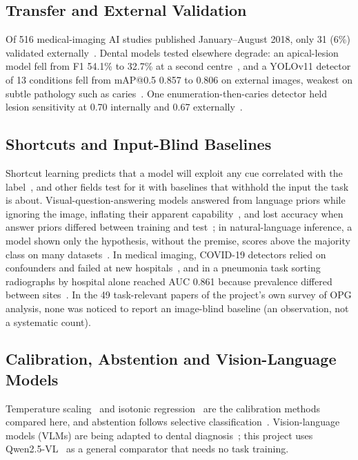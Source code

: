 \subsection{Transfer and External Validation}

Of 516 medical-imaging AI studies published January--August 2018, only 31 (6\%) validated
externally~\cite{kim2019design}. Dental models tested elsewhere degrade: an apical-lesion model fell
from F1 54.1\% to 32.7\% at a second centre~\cite{krois2021generalizability}, and a YOLOv11 detector of
13 conditions fell from mAP@0.5 0.857 to 0.806 on external images, weakest on subtle pathology such as
caries~\cite{mutlu2026comparison}. One enumeration-then-caries detector held lesion sensitivity at
0.70 internally and 0.67 externally~\cite{bizjak2024advancing}. %

\subsection{Shortcuts and Input-Blind Baselines}

Shortcut learning predicts that a model will exploit any cue correlated with the
label~\cite{geirhos2020shortcut}, and other fields test for it with baselines that withhold the input
the task is about. Visual-question-answering models answered from language priors while ignoring the
image, inflating their apparent capability~\cite{goyal2017making}, and lost accuracy when answer
priors differed between training and test~\cite{agrawal2018dont}; in natural-language inference, a
model shown only the hypothesis, without the premise, scores above the majority class on many
datasets~\cite{poliak2018hypothesis}. In medical imaging, COVID-19 detectors relied on confounders
and failed at new hospitals~\cite{degrave2021ai}, and in a pneumonia task sorting radiographs by
hospital alone reached AUC 0.861 because prevalence differed between sites~\cite{zech2018variable}.
In the 49 task-relevant papers of the project's own survey of OPG analysis, none was noticed to
report an image-blind baseline (an observation, not a systematic count). %

\subsection{Calibration, Abstention and Vision-Language Models}

Temperature scaling~\cite{guo2017calibration} and isotonic regression~\cite{zadrozny2002isotonic} are
the calibration methods compared here, and abstention follows selective
classification~\cite{geifman2017selective}. Vision-language models (VLMs) are being adapted to dental
diagnosis~\cite{meng2026dentvlm}; this project uses Qwen2.5-VL~\cite{bai2025qwen25vl} as a general
comparator that needs no task training. %

